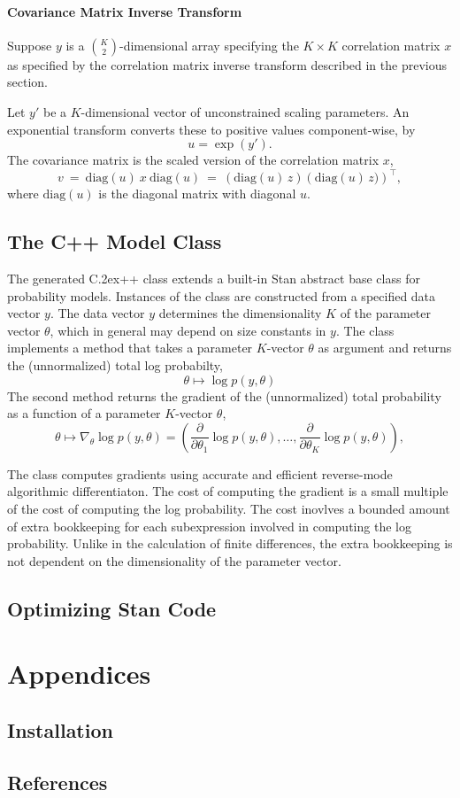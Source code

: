 \documentclass[10pt]{report}
\newcommand{\Stan}{Stan\xspace}
\newcommand*{\Cpp}{C\raise.2ex\hbox{\footnotesize ++}\xspace} %
\begin{document}
\subsection{Covariance Matrix Inverse Transform}

Suppose $y$ is a $K \choose 2$-dimensional array specifying the $K
\times K$ correlation matrix $x$ as specified by the correlation
matrix inverse transform described in the previous section.  

Let $y'$ be a $K$-dimensional vector of unconstrained scaling
parameters.  An exponential transform converts these to positive
values component-wise, by
%
\[
u = \exp(y').
\]
%
The covariance matrix is the scaled version of the correlation matrix
$x$,
\[
v \ = \ \mbox{diag}(u) \ x \ \mbox{diag}(u)
  \ = \ \left(\mbox{diag}(u) \, z\right) \left(\mbox{diag}(u) \, z)\right)^{\top},
\]
%
where $\mbox{diag}(u)$ is the diagonal matrix with diagonal $u$.

\chapter{The C++ Model Class}

The generated \Cpp class extends a built-in \Stan abstract
base class for probability models.  Instances of the class are
constructed from a specified data vector $y$.  The data vector $y$
determines the dimensionality $K$ of the parameter vector $\theta$,
which in general may depend on size constants in $y$.  The class
implements a method that takes a parameter $K$-vector $\theta$ as
argument and returns the (unnormalized) total log probabilty,
\[
\theta 
\mapsto 
\log p(y,\theta) 
\]
The second method returns the gradient of the (unnormalized) total
probability as a function of a parameter $K$-vector $\theta$,
\[
\theta
\mapsto
\nabla_{\theta} \log p(y,\theta)
= ( \frac{\partial}{\partial\theta_1} \log p(y,\theta),
  \ldots, 
  \frac{\partial}{\partial\theta_K} \log p(y,\theta) ),
\]

The class computes gradients using accurate and efficient reverse-mode
algorithmic differentiaton.  The cost of computing the gradient is
a small multiple of the cost of computing the log probability.  The
cost inovlves a bounded amount of extra bookkeeping for each 
subexpression involved in computing the log probability.  Unlike
in the calculation of finite differences, the extra bookkeeping is
not dependent on the dimensionality of the parameter vector.


\chapter{Optimizing \Stan Code}\label{optimization.chapter}


\appendix

\part*{Appendices}


\chapter{Installation}\label{install.appendix}

\chapter*{References}
\end{document}
